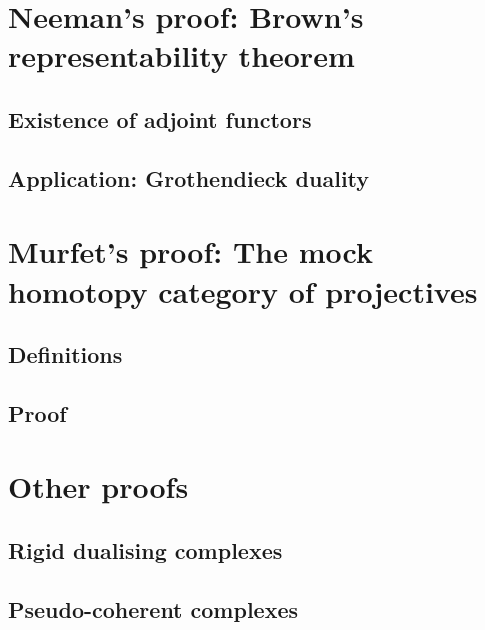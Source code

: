 \documentclass[10pt,a4paper]{article}
\begin{document}
\section{Neeman's proof: Brown's representability theorem}
\label{section:neeman}
\subsection{Existence of adjoint functors}

\subsection{Application: Grothendieck duality}

\section{Murfet's proof: The mock homotopy category of projectives}
\label{section:murfet}
\subsection{Definitions}
\label{subsection:definitions}

\subsection{Proof}
\label{subsection:proof}

\section{Other proofs}
\label{section:other}
\subsection{Rigid dualising complexes}
\label{subsection:yekutieli-zhang}

\subsection{Pseudo-coherent complexes}
\label{subsection:lipman}



\printbibliography
\end{document}
